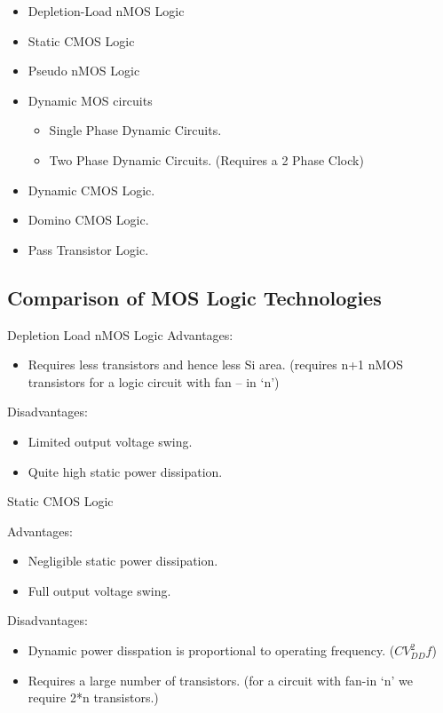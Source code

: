 \documentclass[12pt, letterpaper]{article}
\begin{document}
\begin{itemize}
    \item Depletion-Load nMOS Logic
    \item Static CMOS Logic
    \item Pseudo nMOS Logic
    \item Dynamic MOS circuits
    \begin{itemize}
        \item Single Phase Dynamic Circuits.
        \item Two Phase Dynamic Circuits. (Requires a 2 Phase Clock)
    \end{itemize}
    \item Dynamic CMOS Logic.
    \item Domino CMOS Logic.
    \item Pass Transistor Logic.
\end{itemize}

\subsection{Comparison of MOS Logic Technologies}

							Depletion Load nMOS Logic
Advantages:
\begin{itemize}
    \item Requires less transistors and hence less Si area. (requires n+1 nMOS transistors for a logic circuit with fan – in ‘n’)
\end{itemize}

Disadvantages:
\begin{itemize}
    \item Limited output voltage swing.
    \item Quite high static power dissipation.
\end{itemize}

							Static CMOS Logic

Advantages:
\begin{itemize}
    \item Negligible static power dissipation.
    \item Full output voltage swing.
\end{itemize}

Disadvantages:
\begin{itemize}
    \item Dynamic power disspation is proportional to operating frequency. ($CV_{DD}^2 f$)
    \item Requires a large number of transistors. (for a circuit with fan-in ‘n’ we require 2*n transistors.)
\end{itemize}
\end{document}

